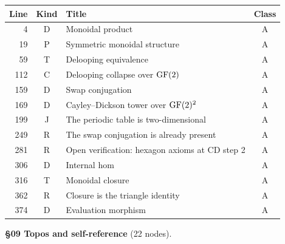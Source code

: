 \begin{center}
\scriptsize
\begin{tabular}{r|c|l|c}
\textbf{Line} & \textbf{Kind} & \textbf{Title} & \textbf{Class} \\
\hline
4 & \textsf{D} & Monoidal product & A \\
19 & \textsf{P} & Symmetric monoidal structure & A \\
59 & \textsf{T} & Delooping equivalence & A \\
112 & \textsf{C} & Delooping collapse over $\operatorname{GF}(2)$ & A \\
159 & \textsf{D} & Swap conjugation & A \\
169 & \textsf{D} & Cayley--Dickson tower over $\operatorname{GF}(2)^2$ & A \\
199 & \textsf{J} & The periodic table is two-dimensional & A \\
249 & \textsf{R} & The swap conjugation is already present & A \\
281 & \textsf{R} & Open verification: hexagon axioms at CD step 2 & A \\
306 & \textsf{D} & Internal hom & A \\
316 & \textsf{T} & Monoidal closure & A \\
362 & \textsf{R} & Closure is the triangle identity & A \\
374 & \textsf{D} & Evaluation morphism & A \\
\end{tabular}
\end{center}

\medskip
\noindent\textbf{\S09 Topos and self-reference} (22 nodes).

